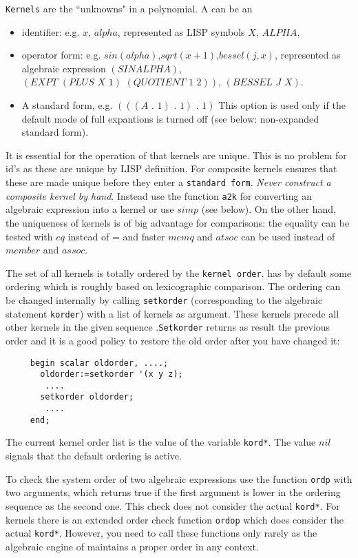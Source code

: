 {\tt Kernels} are the ``unknowns" in a polynomial. 
A  
can be an
\begin{itemize}
\item{identifier}: e.g. $x$, $alpha$, represented as LISP symbols
$X$, $ALPHA$,
\item{operator form}: e.g. $sin(alpha)$,$sqrt(x+1)$,$bessel(j,x)$,
represented as algebraic expression $(SIN ALPHA)$,
$(EXPT\,\,(PLUS\,\, X\,\, 1)\,\, (QUOTIENT\,\, 1\,\, 2))$, $(BESSEL\,\, J\,\, X)$.
\item{A standard form}, e.g. $(((A\,\,.\,\,1)\,\,.\,\,1)\,\,.\,\,1)$  
This option is used only if the default mode of full expantions is
turned off (see below: non-expanded standard form).
\end{itemize}
It is essential for the operation of {\reduce} that kernels are unique.
This is no problem for id's as these are unique by LISP definition.
For composite kernels {\reduce} ensures that these are 
made unique before they enter a {\tt standard form}.
{\em Never construct a composite kernel by hand}. Instead use
the function {\tt *a2k} for converting an algebraic expression
into a kernel or use $simp$ (see below). On the other hand,
the uniqueness of kernels is of big advantage for comparisons:
the equality can be tested with $eq$ instead of = and faster $memq$ and
$atsoc$ can be used instead of $member$ and $assoc$.

The set of all kernels is totally ordered by 
the {\tt kernel order}.
{\reduce} has by default some ordering which is roughly based
on lexicographic comparison. The ordering can be changed internally
by calling {\tt setkorder} 
(corresponding to the algebraic statement
{\tt korder})  with a list of kernels as argument. 
These kernels 
precede all other kernels in the given sequence .{\tt Setkorder} returns
as result the previous order and it is a good policy to restore
the old order after you have changed it:
\begin{verbatim}
     begin scalar oldorder, ....;
       oldorder:=setkorder '(x y z);
        ....
       setkorder oldorder;
        ....
     end;
\end{verbatim}
The current kernel order list is the value of the variable 
{\tt kord*}.
The value $nil$ signals that the default ordering is active.

To check the  system order of two algebraic expressions use the 
function {\tt ordp} with two arguments, 
which returns true if the
first argument is lower in the ordering sequence as the second one.
This check does not consider the actual {\tt kord*}.
For kernels there is an extended order check function 
{\tt ordop} which does consider the actual {\tt kord*}.
However, you need to call these functions only rarely as the
algebraic engine of {\reduce} maintains a proper order in any
context.

